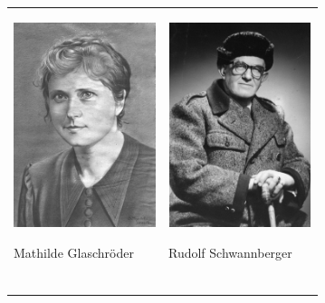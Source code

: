 \begin{center}
\begin{minipage}{9.096cm}
\begin{flushleft}
\tablefirsthead{}
\tablehead{}
\tabletail{}
\tablelasttail{}
\begin{supertabular}{m{4.335cm}m{4.361cm}}

\includegraphics[width=4.154cm,height=5.985cm]{pictures/zulassungsarbeit-img076.jpg}

Mathilde
Glaschröder &

\begin{figure}
\img{}
\caption{}
\end{figure}

\includegraphics[width=4.18cm,height=5.988cm]{pictures/zulassungsarbeit-img077.jpg}

Rudolf
Schwannberger\\

\begin{figure}
\img{}
\caption{}
\end{figure}

\end{supertabular}
\end{flushleft}
\end{minipage}
\end{center}


